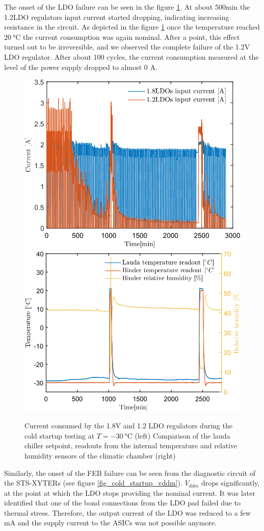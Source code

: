 The onset of the \gls{LDO} failure can be seen in the figure \ref{fig_cold_startup}. At about 500min the 1.2LDO regulators input current started dropping, indicating increasing resistance in the circuit. As depicted in the figure \ref{fig_cold_startup} once the temperature reached $\SI{20}{\celsius}$ the current consumption was again nominal. After a point, this effect turned out to be irreversible, and we observed the complete failure of the 1.2V \gls{LDO} regulator. After about 100 cycles, the current consumption measured at the level of the power supply dropped to almost 0 A. 
\begin{figure}[!h]
\centering
\includegraphics[width=0.46\columnwidth]{Chapter4/images/currents_long.png}
\includegraphics[width=0.48\columnwidth]{Chapter4/images/cycling.png}
\caption{Current consumed by the 1.8V and 1.2 \gls{LDO} regulators during the cold startup testing at $T = \SI{-30}{\celsius}$ (left)
Comparison of the lauda chiller setpoint, readouts from the internal temperature and relative humidity sensors of the climatic chamber (right)}
\label{fig_cold_startup}
\end{figure}

Similarly, the onset of the \gls{FEB} failure can be seen from the diagnostic circuit of the STS-XYTERs (see figure \ref{fig_cold_startup_vddm}). $V_{ddm}$ drops significantly, at the point at which the \gls{LDO} stops providing the nominal current. It was later identified that one of the bond connections from the \gls{LDO} pad failed due to thermal stress. Therefore, the output current of the \gls{LDO} was reduced to a few mA and the supply current to the \glspl{ASIC} was not possible anymore.

